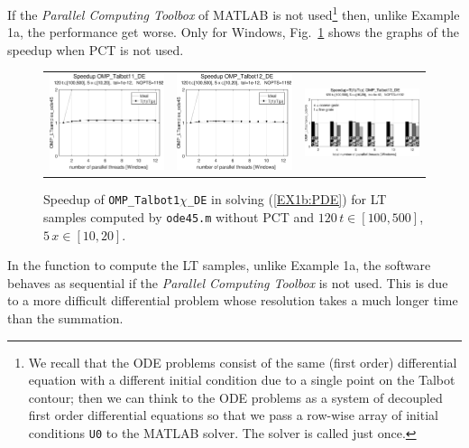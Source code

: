 \documentclass[a4paper,10pt]{report}%
\begin{document}
\noindent If the {\em Parallel Computing Toolbox} of MATLAB is not used\footnote{ We recall that the ODE problems consist
of the same (first order) differential equation with a different initial condition due to a single point on the Talbot
contour; then we can think to the ODE problems as a system of decoupled first order differential equations so that we pass
a row-wise array of initial conditions {\tt U0} to the MATLAB solver. The solver is called just once.} then, unlike
Example 1a, the performance get worse.
Only for Windows, Fig.~\ref{PAR_EX1b_speedup_ode45} shows the graphs of the speedup when PCT is not used.
\begin{figure}[htb]
\centering
\begin{tabular}{ccc} %
\includegraphics[height=0.2\textwidth]{./FIGS/EX1b/EX1b_ode45_speedup_11_Windows.eps} &
\includegraphics[height=0.2\textwidth]{./FIGS/EX1b/EX1b_ode45_speedup_12_Windows.eps} &
\includegraphics[height=0.2\textwidth,keepaspectratio=true]{./FIGS/EX1b/EX1b_ode45_speedup_13_Windows.eps}
\end{tabular}
\caption{\small Speedup of {\tt OMP\_Talbot1$\chi$\_DE} in solving (\ref{EX1b:PDE}) for LT samples
computed by {\tt ode45.m} without PCT and $120\,t\in[100,500]$, $5\,x\in[10,20]$.}
\label{PAR_EX1b_speedup_ode45}
\end{figure}

\noindent In the function to compute the LT samples, unlike Example 1a, the software behaves as
sequential if the {\em Parallel Computing Toolbox} is not used.
This is due to a more difficult differential problem whose resolution takes a much longer time than
the summation.
\end{document}

